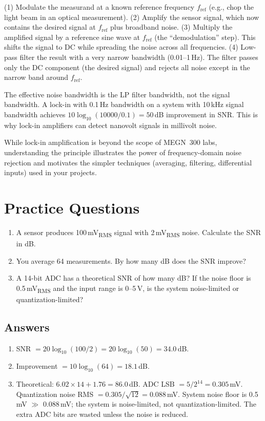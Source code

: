 \documentclass[11pt,letterpaper,twoside,openany]{book}
\begin{document}
(1) Modulate the measurand at a known reference frequency $f_{\text{ref}}$ (e.g., chop the light beam in an optical measurement). (2) Amplify the sensor signal, which now contains the desired signal at $f_{\text{ref}}$ plus broadband noise. (3) Multiply the amplified signal by a reference sine wave at $f_{\text{ref}}$ (the ``demodulation'' step). This shifts the signal to DC while spreading the noise across all frequencies. (4) Low-pass filter the result with a very narrow bandwidth (0.01--1\,Hz). The filter passes only the DC component (the desired signal) and rejects all noise except in the narrow band around $f_{\text{ref}}$.

The effective noise bandwidth is the LP filter bandwidth, not the signal bandwidth. A lock-in with 0.1\,Hz bandwidth on a system with 10\,kHz signal bandwidth achieves $10\log_{10}(10000/0.1) = 50$\,dB improvement in SNR. This is why lock-in amplifiers can detect nanovolt signals in millivolt noise.

While lock-in amplification is beyond the scope of MEGN~300 labs, understanding the principle illustrates the power of frequency-domain noise rejection and motivates the simpler techniques (averaging, filtering, differential inputs) used in your projects.
\section{Practice Questions}
\begin{enumerate}[leftmargin=1.5em]
\item A sensor produces 100\,mV\textsubscript{RMS} signal with 2\,mV\textsubscript{RMS} noise. Calculate the SNR in dB.
\item You average 64 measurements. By how many dB does the SNR improve?
\item A 14-bit ADC has a theoretical SNR of how many dB? If the noise floor is 0.5\,mV\textsubscript{RMS} and the input range is 0--5\,V, is the system noise-limited or quantization-limited?
\end{enumerate}

\subsection{Answers}
\begin{enumerate}[leftmargin=1.5em]
\item SNR $= 20\log_{10}(100/2) = 20\log_{10}(50) = 34.0$\,dB.
\item Improvement $= 10\log_{10}(64) = 18.1$\,dB.
\item Theoretical: $6.02 \times 14 + 1.76 = 86.0$\,dB. ADC LSB $= 5/2^{14} = 0.305$\,mV. Quantization noise RMS $= 0.305/\sqrt{12} = 0.088$\,mV. System noise floor is 0.5\,mV $\gg$ 0.088\,mV; the system is noise-limited, not quantization-limited. The extra ADC bits are wasted unless the noise is reduced.
\end{enumerate}
\end{document}
